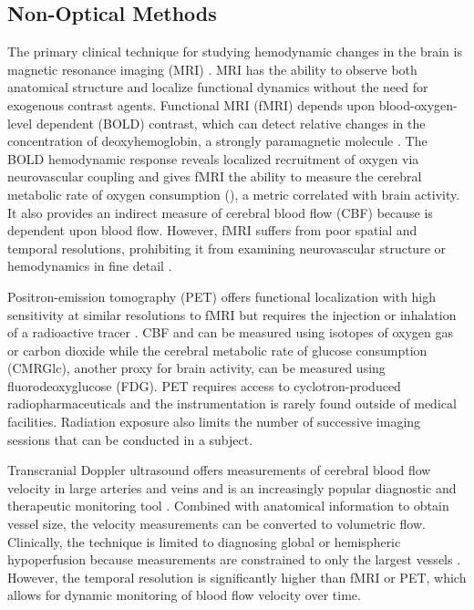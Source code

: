 
\subsection{Non-Optical Methods}
The primary clinical technique for studying hemodynamic changes in the brain is magnetic resonance imaging (MRI) \cite{Calamante:2016dg}. MRI has the ability to observe both anatomical structure and localize functional dynamics without the need for exogenous contrast agents. Functional MRI (fMRI) depends upon blood-oxygen-level dependent (BOLD) contrast, which can detect relative changes in the concentration of deoxyhemoglobin, a strongly paramagnetic molecule \cite{Glover:2011eo}. The BOLD hemodynamic response reveals localized recruitment of oxygen via neurovascular coupling and gives fMRI the ability to measure the cerebral metabolic rate of oxygen consumption (), a metric correlated with brain activity. It also provides an indirect measure of cerebral blood flow (CBF) because  is dependent upon blood flow. However, fMRI suffers from poor spatial and temporal resolutions, prohibiting it from examining neurovascular structure or hemodynamics in fine detail \cite{Glover:2011eo}.

Positron-emission tomography (PET) offers functional localization with high sensitivity at similar resolutions to fMRI but requires the injection or inhalation of a radioactive tracer \cite{Wintermark:2005dd}. CBF and  can be measured using isotopes of oxygen gas or carbon dioxide while the cerebral metabolic rate of glucose consumption (CMRGlc), another proxy for brain activity, can be measured using  fluorodeoxyglucose (FDG). PET requires access to cyclotron-produced radiopharmaceuticals and the instrumentation is rarely found outside of medical facilities. Radiation exposure also limits the number of successive imaging sessions that can be conducted in a subject.

Transcranial Doppler ultrasound offers measurements of cerebral blood flow velocity in large arteries and veins and is an increasingly popular diagnostic and therapeutic monitoring tool \cite{Sarkar:2007fk}. Combined with anatomical information to obtain vessel size, the velocity measurements can be converted to volumetric flow. Clinically, the technique is limited to diagnosing global or hemispheric hypoperfusion because measurements are constrained to only the largest vessels \cite{Naqvi:2013hd}. However, the temporal resolution is significantly higher than fMRI or PET, which allows for dynamic monitoring of blood flow velocity over time.

